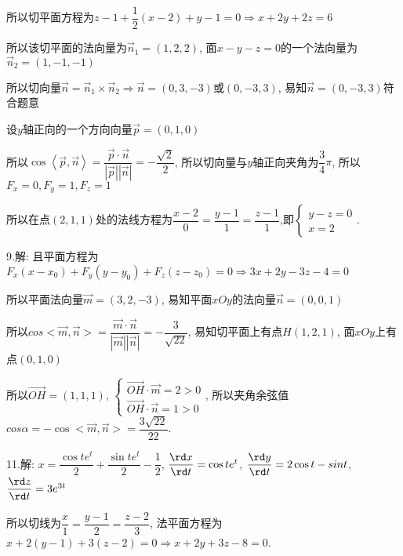   所以切平面方程为$z - 1 + \dfrac{1}{2}(x - 2) + y - 1 = 0 \Rightarrow x + 2y + 2z = 6$

  所以该切平面的法向量为$\overrightarrow n_1  = (1,2,2)$,
  面$x-y-z=0$的一个法向量为$\overrightarrow n_2  = (1,-1,-1)$

  所以切向量$\overrightarrow n  = \overrightarrow n_1  \times \overrightarrow n_2\Rightarrow \overrightarrow n=(0,3,-3)$或$(0,-3,3)$,
  易知$\overrightarrow n=(0,-3,3)$符合题意

  设$y$轴正向的一个方向向量$\overrightarrow p=(0,1,0)$

  所以$ \cos \left\langle {\vec p,\vec n} \right\rangle  = \dfrac{{\vec p \cdot \vec n}}{{|\vec p||\vec n|}} =  - \dfrac{{\sqrt 2 }}{2}$,
  所以切向量与$y$轴正向夹角为$\dfrac{3}{4}\pi $,
  所以$ F_x=0,F_y=1,F_z=1$

  所以在点$(2,1,1)$处的法线方程为$\dfrac{{x - 2}}{0} = \dfrac{{y - 1}}{1} = \dfrac{{z - 1}}{1}$,即$\begin{cases}y-z=0\\x=2\end{cases}$.

  9.解: 且平面方程为$F_x(x-x_0)+F_y(y-y_0)+F_z(z-z_0)=0 \Rightarrow3x+2y-3z-4=0$

  所以平面法向量$\overrightarrow m=(3,2,-3)$,
  易知平面$xOy$的法向量$\overrightarrow n=(0,0,1)$

  所以$ cos<\overrightarrow{m},\overrightarrow{n}>=\dfrac{{\overrightarrow{m}  \cdot \overrightarrow{n} }}{{\left| {\overrightarrow{m} } \right|\left| {\overrightarrow{n} } \right|}} = -\dfrac{3}{{\sqrt {22} }}$,
  易知切平面上有点$H(1,2,1)$, 面$xOy$上有点$(0,1,0)$

  所以$\overrightarrow {OH}  = \left( {1,1,1} \right)$,
  $\left\{ {\begin{array}{*{20}{l}}
    {\overrightarrow {OH}  \cdot \vec m = 2 > 0}\\
    {\overrightarrow {OH}  \cdot \vec n = 1 > 0}
    \end{array}} \right.$,
  所以夹角余弦值$cos\alpha  =  - \cos  < \overrightarrow m ,\overrightarrow n  >  = \dfrac{{3\sqrt {22} }}{{22}}$.

  11.解: $x=\dfrac{{\cos te^t}}{2} + \dfrac{{\sin te^t}}{2} - \dfrac{1}{2}$,
  $\dfrac{{\rd x}}{{\rd t}} = \cos te^t$, $\dfrac{{\rd y}}{{\rd t}} = 2\cos t-sint$, $\dfrac{{\rd z}}{{\rd t}} = 3e^{3t}$

  所以切线为$\dfrac{x}{1} = \dfrac{{y - 1}}{2} = \dfrac{{z - 2}}{3}$,
  法平面方程为$x+2(y-1)+3(z-2)=0 \Rightarrow x +2y+3z-8=0$.

